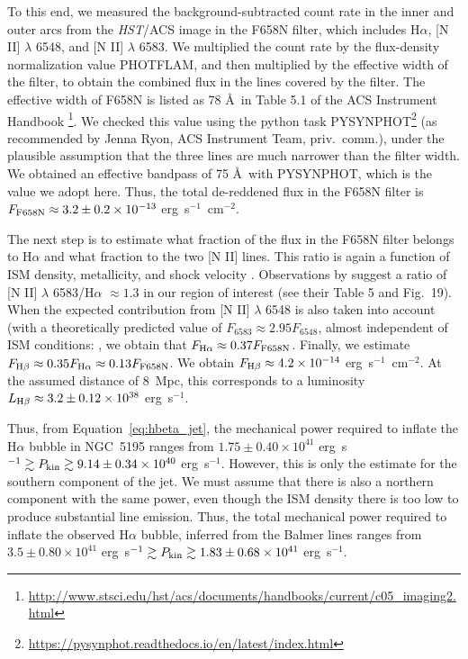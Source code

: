 \documentclass[fleqn,usenatbib]{mnras}
\def\eqn{Equation}
\begin{document}
To this end, we measured the background-subtracted count rate in the inner and outer arcs from the 
{\it HST}/ACS image in the F658N filter, which includes H$\alpha$, [N II] $\lambda$ 6548, and [N II] 
$\lambda$ 6583. We multiplied the count rate by the flux-density normalization value PHOTFLAM, and then 
multiplied by the effective width of the filter, to obtain the combined flux in the lines covered by 
the filter. The effective width of F658N is listed as 78 \AA\ in Table 5.1 of the ACS Instrument 
Handbook \footnote{\url{http://www.stsci.edu/hst/acs/documents/handbooks/current/c05_imaging2.html}}. We 
checked this value using the python task {\small{PYSYNPHOT}}\footnote{\url{https://pysynphot.readthedocs.io/en/latest/index.html}} (as recommended by Jenna Ryon, ACS Instrument Team, priv.~comm.), under the 
plausible assumption that the three lines are much narrower than the filter width. We obtained an 
effective bandpass of 75 \AA\ with {\small{PYSYNPHOT}}, which is the value we adopt here. Thus, the 
total de-reddened flux in the F658N filter is $F_{\rm{F658N}} \approx 3.2 \pm 0.2 \times 10^{-13}$ erg~s$^{-1}$~cm$^{-2}$.

The next step is to estimate what fraction of the flux in the F658N filter belongs to H$\alpha$ and 
what fraction to the two [N II] lines. This ratio is again a function of ISM density, metallicity, and 
shock velocity \citep{Allenetal2008}. Observations by \cite{Hoopes-Walterbos} suggest a ratio of [N II] 
$\lambda$ 6583/H$\alpha$ $\approx 1.3$ in our region of interest (see their Table 5 and Fig.~19). When 
the expected contribution from [N II] $\lambda$ 6548 is also taken into account (with a theoretically 
predicted value of $F_{6583} \approx 2.95 F_{6548}$, almost independent of ISM conditions: \citep{Allenetal2008}, we obtain that $F_{{\rm{H}}\alpha} \approx
0.37F_{\rm{F658N}}$. Finally, we estimate $F_{{\rm{H}}\beta} \approx 0.35F_{{\rm{H}}\alpha} \approx 
0.13F_{\rm{F658N}}$. We obtain $F_{{\rm{H}}\beta} \approx 4.2 \times 10^{-14}$ erg~s$^{-1}$~cm$^{-2}$. At the assumed distance of 8~Mpc, this corresponds to a luminosity $L_{\rm{H}\beta} \approx 3.2 \pm 0.12
\times 10^{38}$ erg~s$^{-1}$. 

{Thus, from \eqn~\ref{eq:hbeta_jet}, the mechanical power required to inflate the H$\alpha$ bubble in NGC~5195 ranges from $1.75 \pm 0.40 \times 10^{41}$ erg~s$^{-1} \gtrsim P_{\rm kin} \gtrsim 9.14 \pm 0.34 \times 10^{40}$ erg~s$^{-1}$.
However, this is only the estimate for the southern component of the jet. 
We must assume that there is also a northern component with the same power, even though the ISM density 
there is too low to produce substantial line emission. Thus, the total mechanical power required to inflate the observed H$\alpha$ bubble, inferred from the Balmer lines ranges from  $3.5 \pm 0.80 \times 10^{41}$ erg~s$^{-1} \gtrsim P_{\rm kin} \gtrsim 1.83 \pm 0.68 \times 10^{41}$ erg~s$^{-1}$.}
\end{document}
